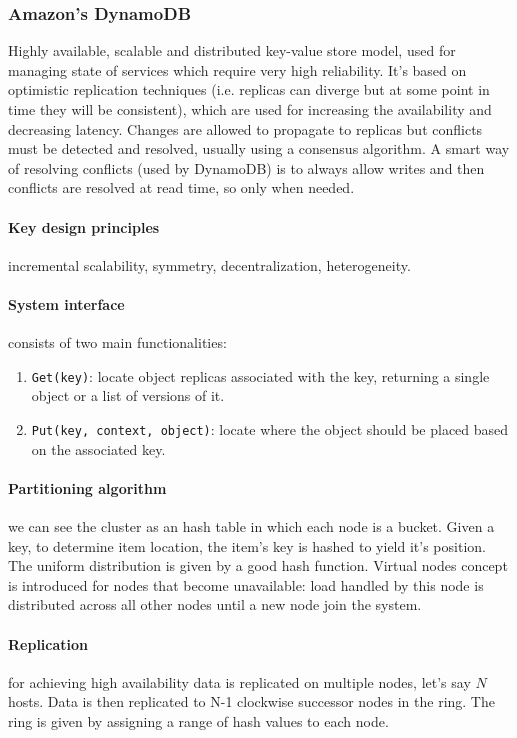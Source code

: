 \documentclass{article}
\begin{document}
\subsubsection{Amazon's DynamoDB}
Highly available, scalable and distributed key-value store model, used for managing state of services which require very high reliability. It's based on optimistic replication techniques (i.e. replicas can diverge but at some point in time they will be consistent), which are used for increasing the availability and decreasing latency. Changes are allowed to propagate to replicas but conflicts must be detected and resolved, usually using a consensus algorithm. A smart way of resolving conflicts (used by DynamoDB) is to always allow writes and then conflicts are resolved at read time, so only when needed.

\paragraph{Key design principles} incremental scalability, symmetry, decentralization, heterogeneity.
\paragraph{System interface} consists of two main functionalities:
\begin{enumerate}
    \item \texttt{Get(key)}: locate object replicas associated with the key, returning a single object or a list of versions of it.
    \item \texttt{Put(key, context, object)}: locate where the object should be placed based on the associated key.
\end{enumerate}

\paragraph{Partitioning algorithm} we can see the cluster as an hash table in which each node is a bucket. Given a key, to determine item location, the item's key is hashed to yield it's position. The uniform distribution is given by a good hash function. Virtual nodes concept is introduced for nodes that become unavailable: load handled by this node is distributed across all other nodes until a new node join the system.

\paragraph{Replication} for achieving high availability data is replicated on multiple nodes, let's say $N$ hosts. Data is then replicated to N-1 clockwise successor nodes in the ring. The ring is given by assigning a range of hash values to each node.
\end{document}
